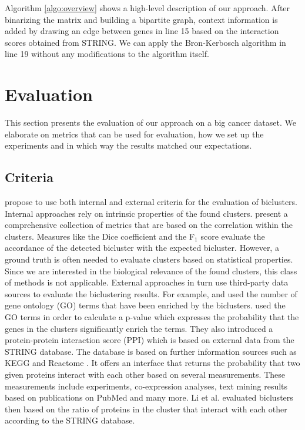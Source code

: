 \documentclass[10pt, conference, compsocconf]{IEEEtran}
\begin{document}
Algorithm \ref{algo:overview} shows a high-level description of our approach.
After binarizing the matrix and building a bipartite graph, context information is added by drawing an edge between genes in line 15 based on the interaction scores obtained from STRING.
We can apply the Bron-Kerbosch algorithm in line 19 without any modifications to the algorithm itself.

\section{Evaluation}
This section presents the evaluation of our approach on a big cancer dataset.
We elaborate on metrics that can be used for evaluation, how we set up the experiments and in which way the results matched our expectations.
\label{sec:evaluation}
\subsection{Criteria}
\cite{Eren13} propose to use both internal and external criteria for the evaluation of biclusters.
Internal approaches rely on intrinsic properties of the found clusters.
\cite{Pontes157} present a comprehensive collection of metrics that are based on the correlation  within the clusters.
Measures like the Dice coefficient and the F$_{1}$ score evaluate the accordance of the detected bicluster with the expected bicluster.
However, a ground truth is often needed to evaluate clusters based on statistical properties.
Since we are interested in the biological relevance of the found clusters, this class of methods is not applicable.
External approaches in turn use third-party data sources to evaluate the biclustering results.
For example, \cite{Prelic06} and \cite{Oghabian14} used the number of gene ontology (GO) terms that have been enriched by the biclusters.
\cite{Li2012} used the GO terms in order to calculate a p-value which expresses the probability that the genes in the clusters significantly enrich the terms.
They also introduced a protein-protein interaction score (PPI) which is based on external data from the STRING database.
The database is based on further information sources such as KEGG \citep{Kegg00} and Reactome \citep{Reactome14}.
It offers an interface that returns the probability that two given proteins interact with each other based on several measurements.
These measurements include experiments, co-expression analyses, text mining results based on publications on PubMed \citep{PubMed13} and many more.
Li et al. evaluated biclusters then based on the ratio of proteins in the cluster that interact with each other according to the STRING database.
\end{document}
